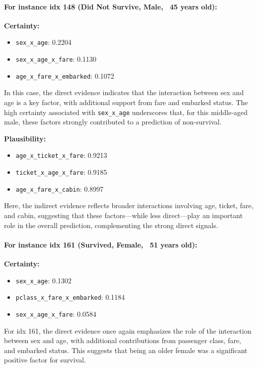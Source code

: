 \documentclass[acmlarge]{acmart}
\begin{document}
\paragraph{For instance idx 148 (Did Not Survive, Male, ~45 years old):} \newline 
\textbf{Certainty:}
\begin{itemize}
    \item \texttt{sex\_x\_age}: 0.2204
    \item \texttt{sex\_x\_age\_x\_fare}: 0.1130
    \item \texttt{age\_x\_fare\_x\_embarked}: 0.1072
\end{itemize}
In this case, the direct evidence indicates that the interaction between sex and age is a key factor, with additional support from fare and embarked status. The high certainty associated with \texttt{sex\_x\_age} underscores that, for this middle-aged male, these factors strongly contributed to a prediction of non-survival.

\textbf{Plausibility:}
\begin{itemize}
    \item \texttt{age\_x\_ticket\_x\_fare}: 0.9213
    \item \texttt{ticket_x_age_x_fare}: 0.9185
    \item \texttt{age\_x\_fare\_x\_cabin}: 0.8997
\end{itemize}
Here, the indirect evidence reflects broader interactions involving age, ticket, fare, and cabin, suggesting that these factors—while less direct—play an important role in the overall prediction, complementing the strong direct signals.

\paragraph{For instance idx 161 (Survived, Female, ~51 years old):}  
\newline 
\textbf{Certainty:}
\begin{itemize}
    \item \texttt{sex\_x\_age}: 0.1302
    \item \texttt{pclass\_x\_fare\_x\_embarked}: 0.1184
    \item \texttt{sex\_x\_age\_x\_fare}: 0.0584
\end{itemize}
For idx 161, the direct evidence once again emphasizes the role of the interaction between sex and age, with additional contributions from passenger class, fare, and embarked status. This suggests that being an older female was a significant positive factor for survival.
\end{document}
